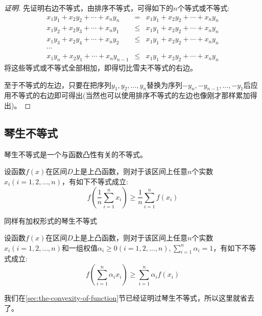 \begin{proof}[证明]
  先证明右边不等式，由排序不等式，可得如下的$n$个等式或不等式:
  \begin{eqnarray*}
    x_1y_1+x_2y_2+\cdots+x_ny_n &=& x_1y_1+x_2y_2+\cdots+x_ny_n \\
    x_1y_2+x_2y_3+\cdots+x_ny_1 & \leqslant & x_1y_1+x_2y_2+\cdots+x_ny_n \\
    x_1y_3+x_2y_4+\cdots+x_ny_2 & \leqslant & x_1y_1+x_2y_2+\cdots+x_ny_n \\
    \cdots & & \\
    x_1y_n+x_2y_1+\cdots+x_ny_{n-1} & \leqslant & x_1y_1+x_2y_2+\cdots+x_ny_n 
  \end{eqnarray*}
  将这些等式或不等式全部相加，即得切比雪夫不等式的右边。

  至于不等式的左边，只要在把序列$y_1,y_2,\ldots,y_n$替换为序列$-y_n,-y_{n-1},\ldots,-y_1$后应用不等式的右边即可得出(当然也可以使用排序不等式的左边也像刚才那样累加得出)。
\end{proof}

\subsection{琴生不等式}
\label{sec:jenson-inequality}

琴生不等式是一个与函数凸性有关的不等式。
\begin{theorem}[琴生不等式]
  设函数$f(x)$在区间$D$上是上凸函数，则对于该区间上任意$n$个实数$x_i(i=1,2,\ldots,n)$，有如下不等式成立:
  \begin{equation}
    \label{eq:jenson-inequality-some-import-inequality}
    f \left( \frac{1}{n} \sum_{i=1}^nx_i \right) \geqslant
    \frac{1}{n} \sum_{i=1}^n f(x_i)
  \end{equation}
\end{theorem}

同样有加权形式的琴生不等式
\begin{theorem}[加权形式的琴生不等式]
  设函数$f(x)$在区间$D$上是上凸函数，则对于该区间上任意$n$个实数$x_i(i=1,2,\ldots,n)$和一组权值$\alpha_i\geqslant 0(i=1,2,\ldots,n), \sum_{i=1}^n\alpha_i=1$，有如下不等式成立:
  \begin{equation}
    \label{eq:jenson-inequality-some-import-inequality}
    f \left( \sum_{i=1}^n\alpha_ix_i \right) \geqslant
    \sum_{i=1}^n \alpha_if(x_i)
  \end{equation}
\end{theorem}

我们在\ref{sec:the-convexity-of-function}节已经证明过琴生不等式，所以这里就省去了。

